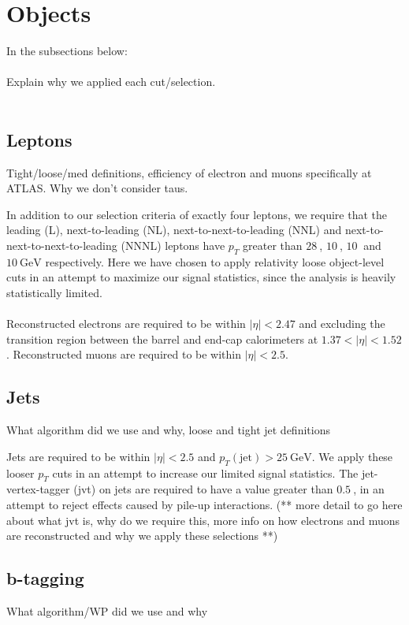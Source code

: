 \section{Objects}
In the subsections below:\\\\
Explain why we applied each cut/selection.\\\\


\subsection{Leptons}
Tight/loose/med definitions, efficiency of electron and muons specifically at ATLAS. Why we don't consider taus.


In addition to our selection criteria of exactly four leptons, we require that the leading (L), next-to-leading (NL), next-to-next-to-leading (NNL) and next-to-next-to-next-to-leading (NNNL) leptons have $p_{T}$ greater than $\SI{28}{}$, $\SI{10}{}$, $\SI{10}{}$ and $\SI{10}{\GeV}$ respectively. Here we have chosen to apply relativity loose object-level cuts in an attempt to maximize our signal statistics, since the analysis is heavily statistically limited.\\\\
Reconstructed electrons are required to be within $|\eta| < 2.47$ and excluding the transition region between the barrel and end-cap calorimeters at $1.37 < |\eta| < 1.52$. Reconstructed muons are required to be within $|\eta| < 2.5$.
\subsection{Jets}
What algorithm did we use and why, loose and tight jet definitions

Jets are required to be within $|\eta| < 2.5$ and $p_{T}(\text{jet}) > \SI{25}{\GeV}$. We apply these looser $p_T$ cuts in an attempt to increase our limited signal statistics. The jet-vertex-tagger (jvt) on jets are required to have a value greater than $\SI{0.5}{}$, in an attempt to reject effects caused by pile-up interactions. (** more detail to go here about what jvt is, why do we require this, more info on how electrons and muons are reconstructed and why we apply these selections **)

\subsection{b-tagging}
What algorithm/WP did we use and why
